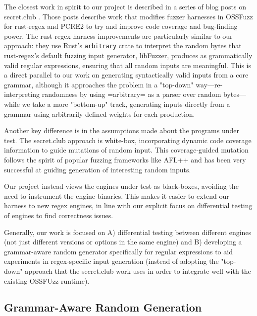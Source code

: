 \documentclass[acmsmall,nonacm,screen]{acmart}
\begin{document}
The closest work in spirit to our project is described in a series of blog posts on secret.club \cite{crump2024regexfuzzing}. Those posts describe work that modifies fuzzer harnesses in OSSFuzz for rust-regex and PCRE2 to try and improve code coverage and bug-finding power. The rust-regex harness improvements are particularly similar to our approach: they use Rust's \texttt{arbitrary} crate to interpret the random bytes that rust-regex's default fuzzing input generator, libFuzzer, produces as grammatically valid regular expressions, ensuring that all random inputs are meaningful. This is a direct parallel to our work on generating syntactically valid inputs from a core grammar, although it approaches the problem in a "top-down" way—re-interpreting randomness by using =arbitrary= as a parser over random bytes—while we take a more "bottom-up" track, generating inputs directly from a grammar using arbitrarily defined weights for each production.

Another key difference is in the assumptions made about the programs under test. The secret.club approach is white-box, incorporating dynamic code coverage information to guide mutations of random input. This coverage-guided mutation follows the spirit of popular fuzzing frameworks like AFL++ and has been very successful at guiding generation of interesting random inputs.

Our project instead views the engines under test as black-boxes, avoiding the need to instrument the engine binaries. This makes it easier to extend our harness to new regex engines, in line with our explicit focus on differential testing of engines to find correctness issues.

Generally, our work is focused on A) differential testing between different engines (not just different versions or options in the same engine) and B) developing a grammar-aware random generator specifically for regular expressions to aid experiments in regex-specific input generation (instead of adopting the "top-down" approach that the secret.club work uses in order to integrate well with the existing OSSFUzz runtime).

\subsection{Grammar-Aware Random Generation}
\end{document}
